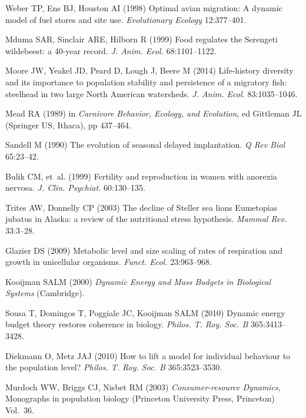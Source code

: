 \documentclass{pnastwo}
\begin{document}
\begin{article}
{\begin{thebibliography}{10}
Weber TP, Ens BJ, Houston AI
\newblock (1998) {Optimal avian migration: A dynamic model of fuel stores and
  site use}.
\newblock \emph{Evolutionary Ecology} 12:377--401.

Mduma SAR, Sinclair ARE, Hilborn R
\newblock (1999) {Food regulates the Serengeti wildebeest: a 40-year record}.
\newblock \emph{J. Anim. Ecol.} 68:1101--1122.

Moore JW, Yeakel JD, Peard D, Lough J, Beere M
\newblock (2014) {Life-history diversity and its importance to population
  stability and persistence of a migratory fish: steelhead in two large North
  American watersheds}.
\newblock \emph{J. Anim. Ecol.} 83:1035--1046.

Mead RA
\newblock (1989) in \emph{Carnivore Behavior, Ecology, and Evolution}, ed{}
  Gittleman JL
\newblock (Springer US, Ithaca), pp 437--464.

Sandell M
\newblock (1990) {The evolution of seasonal delayed implantation}.
\newblock \emph{Q Rev Biol} 65:23--42.

Bulik CM, {et~al.}
\newblock (1999) {Fertility and reproduction in women with anorexia nervosa}.
\newblock \emph{J. Clin. Psychiat.} 60:130--135.

Trites AW, Donnelly CP
\newblock (2003) {The decline of Steller sea lions Eumetopias jubatus in
  Alaska: a review of the nutritional stress hypothesis}.
\newblock \emph{Mammal Rev.} 33:3--28.

Glazier DS
\newblock (2009) {Metabolic level and size scaling of rates of respiration and
  growth in unicellular organisms}.
\newblock \emph{Funct. Ecol.} 23:963--968.

Kooijman SALM
\newblock (2000) \emph{{Dynamic Energy and Mass Budgets in Biological Systems}}
\newblock (Cambridge).

Sousa T, Domingos T, Poggiale JC, Kooijman SALM
\newblock (2010) {Dynamic energy budget theory restores coherence in biology}.
\newblock \emph{Philos. T. Roy. Soc. B} 365:3413--3428.

Diekmann O, Metz JAJ
\newblock (2010) {How to lift a model for individual behaviour to the
  population level?}
\newblock \emph{Philos. T. Roy. Soc. B} 365:3523--3530.

Murdoch WW, Briggs CJ, Nisbet RM
\newblock (2003) \emph{{Consumer-resource Dynamics}}, Monographs in population
  biology
\newblock (Princeton University Press, Princeton) Vol.{}~36.


\end{thebibliography}}
\end{article}
\end{document}
